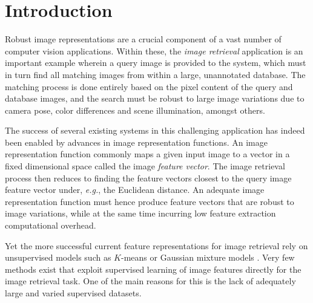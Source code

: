 \section{Introduction}

Robust image representations are a crucial component of a vast number of computer vision applications. Within these, the \emph{image retrieval} application is an important example wherein a query image is provided to the system, which must in turn find all matching images from within a large, unannotated database. The matching process is done entirely based on the pixel content of the query and database images, and the search must be robust to large image variations due to camera pose, color differences and scene illumination, amongst others.

The success of several existing systems in this challenging application has indeed been enabled by advances in  image representation functions. An image representation function commonly maps a given input image to a vector in a fixed dimensional space called the image \emph{feature vector}. The image retrieval process then reduces to finding the feature vectors closest to the query image feature vector under, \textit{e.g.}, the Euclidean distance. An adequate image representation function must hence produce feature vectors that are robust to image variations, while at the same time incurring low feature extraction computational overhead.


Yet the more successful current feature representations for image retrieval rely on unsupervised models such as $K$-means \cite{Delhumeau2013} or Gaussian mixture models \cite{Perronnin2010}. Very few methods \cite{Arandjelovic15,Rana,Bilen2015} exist that exploit supervised learning of image features directly for the image retrieval task. One of the main reasons for this is the lack of adequately large and varied supervised datasets. %

